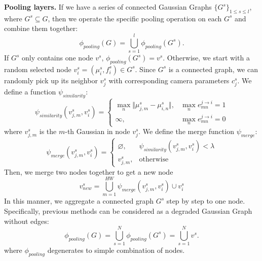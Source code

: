 \textbf{Pooling layers.} If we have a series of connected Gaussian Graphs $\{G^{s}\}_{1\leq s\leq l}$, where $G^{s}\subseteq G$, then we operate the specific pooling operation on each $G^{s}$ and combine them together:
\begin{equation}
    \phi_{pooling}(G)=\bigcup_{s=1}^{l}\phi_{pooling}(G^{s}).
\end{equation}
If $G^{s}$ only contains one node $v^{s}$, $\phi_{pooling}(G^{s})=v^{s}$.
Otherwise, we start with a random selected node $v_{i}^{s}=(\mu_{i}^{s},f_{i}^{s})\in G^{s}$. 
Since $G^{s}$ is a connected graph, we can randomly pick up its neighbor $v_{j}^{s}$ with corresponding camera parameters $c_{j}^{s}$.
We define a function $\psi_{similarity}$:
\begin{equation}
    \psi_{similarity}\left(v_{j,m}^{s}, v_{i}^{s}\right)=
    \begin{cases}
        \mathop{\max}\limits_{n}\Vert\mu_{j,m}^{s}-\mu_{i,n}^{s}\Vert, & \mathop{\max}\limits_{n} e_{mn}^{j\rightarrow i}=1 \\
        \infty, & \mathop{\max}\limits_{n} e_{mn}^{j\rightarrow i}=0
    \end{cases} 
\end{equation}
where $v_{j,m}^{s}$ is the $m$-th Gaussian in node $v_{j}^{s}$. We define the merge function $\psi_{merge}$:
\begin{equation}
    \psi_{merge}\left(v_{j,m}^{s}, v_{i}^{s}\right)=
    \begin{cases}
        \varnothing, & \psi_{similarity}\left(v_{j,m}^{s}, v_{i}^{s}\right)<\lambda\\
        v_{j,m}^{s}, & \textrm{otherwise}
    \end{cases}
\end{equation}
Then, we merge two nodes together to get a new node
\begin{equation}
    v_{new}^{s}=\bigcup_{m=1}^{HW}\psi_{merge}\left(v_{j,m}^{s}, v_{i}^{s}\right)\cup v_{i}^{s}
\end{equation}
In this manner, we aggregate a connected graph $G^{s}$ step by step to one node. Specifically, previous methods can be considered as a degraded Gaussian Graph without edges:
\begin{equation}
    \phi_{pooling}(G)=\bigcup_{s=1}^{N}\phi_{pooling}(G^{s})=\bigcup_{s=1}^{N}v^{s}.
\end{equation}
where $\phi_{pooling}$ degenerates to simple combination of nodes.

